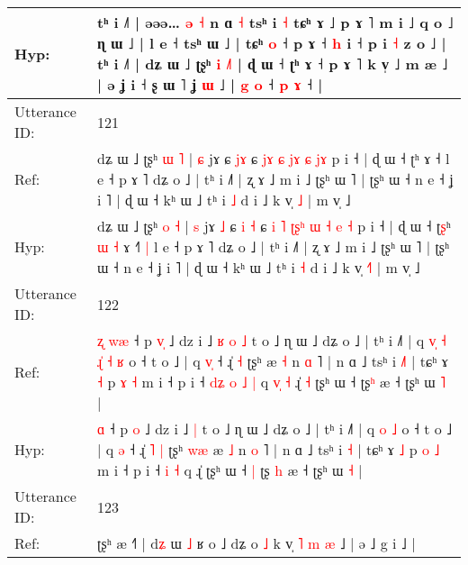 \documentclass[10pt]{article}
\DeclareRobustCommand{\hl}[1]{{\textcolor{red}{#1}}}
\begin{document}
\begin{longtable}{ll}
 \\
Hyp: & tʰ i ˩˥ | əəə…\hl{ }\hl{ə}\hl{ }\hl{˧} n ɑ \hl{˧} tsʰ i \hl{˧} tɕʰ ɤ ˩ p ɤ ˥ m i ˩ q o ˩ ɳ ɯ ˩ | l e ˧ tsʰ ɯ ˩ | tɕʰ \hl{o} ˧ p ɤ ˧ \hl{h} i ˧ p i \hl{˧} z o ˩ | tʰ i ˩˥ | dʑ ɯ ˩ ʈʂʰ \hl{i} \hl{˩}˥ | ɖ ɯ ˧ ʈʰ ɤ ˧ p ɤ ˥ k v̩ ˩ m æ ˩ | ə\hl{}\hl{} ʝ i ˧ ʂ ɯ ˥ ʝ \hl{ɯ} ˩ | \hl{g} \hl{}\hl{o} ˧ \hl{p} \hl{ɤ} ˧ |
 \\
\midrule
Utterance ID: & 121 \\
Ref: & dʑ ɯ ˩ ʈʂʰ \hl{ɯ} \hl{˥} | \hl{ɕ} jɤ\hl{}\hl{} ɕ \hl{}\hl{j}\hl{ɤ} ɕ \hl{}\hl{j}\hl{ɤ} \hl{}\hl{ɕ}\hl{ }\hl{j}\hl{ɤ} \hl{ɕ} \hl{}\hl{j}\hl{ɤ} p i ˧ | ɖ ɯ ˧ ʈ\hl{}ʰ\hl{}\hl{}\hl{}\hl{} ɤ ˧\hl{}\hl{}\hl{} l e ˧ p ɤ ˥ dʑ o ˩ | tʰ i ˩˥ | ʐ ɤ ˩ m i ˩ ʈʂʰ ɯ ˥ | ʈʂʰ ɯ ˧ n e ˧ ʝ i ˥ | ɖ ɯ ˧ kʰ ɯ ˩ tʰ i \hl{˩} d i ˩ k v̩ \hl{}\hl{˩} | m v̩ ˩
 \\
Hyp: & dʑ ɯ ˩ ʈʂʰ \hl{o} \hl{˧} | \hl{s} jɤ\hl{ }\hl{˩} ɕ \hl{i}\hl{ }\hl{˧} ɕ \hl{i}\hl{ }\hl{˥} \hl{ʈ}\hl{ʂ}\hl{ʰ}\hl{ }\hl{ɯ} \hl{˧} \hl{e}\hl{ }\hl{˧} p i ˧ | ɖ ɯ ˧ ʈ\hl{ʂ}ʰ\hl{ }\hl{ɯ}\hl{ }\hl{˧} ɤ ˧\hl{˥}\hl{ }\hl{|} l e ˧ p ɤ ˥ dʑ o ˩ | tʰ i ˩˥ | ʐ ɤ ˩ m i ˩ ʈʂʰ ɯ ˥ | ʈʂʰ ɯ ˧ n e ˧ ʝ i ˥ | ɖ ɯ ˧ kʰ ɯ ˩ tʰ i \hl{˧} d i ˩ k v̩ \hl{˧}\hl{˥} | m v̩ ˩
 \\
\midrule
Utterance ID: & 122 \\
Ref: & \hl{ʐ}\hl{ }\hl{w}\hl{æ} ˧ p \hl{v}\hl{̩} ˩ dz i ˩\hl{ }\hl{ʁ}\hl{ }\hl{o} \hl{˩} t o ˩ ɳ ɯ ˩ dʑ o ˩ | tʰ i ˩˥ | q\hl{ }\hl{v}\hl{̩}\hl{ }\hl{˧}\hl{ }\hl{ɻ}\hl{̍} \hl{˧} \hl{ʁ} o ˧ t o ˩ | q \hl{v}\hl{̩} ˧ ɻ̍\hl{}\hl{} \hl{˧} ʈʂʰ\hl{}\hl{}\hl{} æ \hl{˧} n \hl{ɑ} ˥ | n ɑ ˩ tsʰ i \hl{˩}\hl{˥} | tɕʰ ɤ \hl{˧} p \hl{ɤ} \hl{˧} m i ˧ p i ˧\hl{ }\hl{d}\hl{ʑ}\hl{ }\hl{o} \hl{˩} \hl{|} q\hl{ }\hl{v}\hl{̩}\hl{ }\hl{˧} ɻ̍\hl{ }\hl{˧} ʈʂʰ ɯ ˧\hl{}\hl{} ʈʂ\hl{}\hl{ʰ} æ ˧ ʈʂʰ ɯ \hl{˥} |
 \\
Hyp: & \hl{}\hl{}\hl{}\hl{ɑ} ˧ p \hl{}\hl{o} ˩ dz i ˩\hl{}\hl{}\hl{}\hl{} \hl{|} t o ˩ ɳ ɯ ˩ dʑ o ˩ | tʰ i ˩˥ | q\hl{}\hl{}\hl{}\hl{}\hl{}\hl{}\hl{}\hl{} \hl{o} \hl{˩} o ˧ t o ˩ | q \hl{}\hl{ə} ˧ ɻ̍\hl{ }\hl{˥} \hl{|} ʈʂʰ\hl{ }\hl{w}\hl{æ} æ \hl{˩} n \hl{o} ˥ | n ɑ ˩ tsʰ i \hl{}\hl{˧} | tɕʰ ɤ \hl{˩} p \hl{o} \hl{˩} m i ˧ p i ˧\hl{}\hl{}\hl{}\hl{}\hl{} \hl{i} \hl{˧} q\hl{}\hl{}\hl{}\hl{}\hl{} ɻ̍\hl{}\hl{} ʈʂʰ ɯ ˧\hl{ }\hl{|} ʈʂ\hl{ }\hl{h} æ ˧ ʈʂʰ ɯ \hl{˧} |
 \\
\midrule
Utterance ID: & 123 \\
Ref: & ʈʂʰ æ ˧\hl{˥} | d\hl{ʑ} ɯ \hl{˩} ʁ o ˩ dʑ o \hl{˩} k v̩\hl{ }\hl{˥}\hl{ }\hl{m}\hl{ }\hl{æ} ˩ | ə ˩ g i ˩ |
 \\

\end{longtable}
\end{document}
